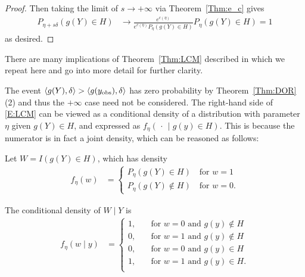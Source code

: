 \begin{proof}
Then taking the limit of $s \to +\infty$ via Theorem~\ref{Thm:e_c} gives
\begin{align*}
 P_{\eta+s\delta}(g(Y) \in H)
		&\to \frac{e^{c(\eta)}}{ e^{c(\eta)} P_\eta (g(Y) \in H) } P_\eta (g(Y)\in H) = 1
 \end{align*}
 as desired.   
\end{proof}


There are many implications of Theorem~\ref{Thm:LCM} described in \citet{Geyer:gdor}
which we repeat here and go into more detail for further clarity.

The event $\langle g(Y),\delta \rangle > \langle g(y_{\text{obs}}),\delta \rangle$ has zero probability by 
Theorem~\ref{Thm:DOR}(2) and thus the $+\infty$ case need not be considered.
The right-hand side of \eqref{E:LCM} can be viewed as a conditional density of a 
distribution with parameter $\eta$ given $g(Y) \in H$, and expressed as $f_{\eta}
(\, \cdot\,  \mid g(y) \in H)$.  This is because the numerator
is in fact a joint density, which can be reasoned as follows:

Let $W = I(g(Y) \in H)$, which has density 
\begin{align*}
	f_\eta(w) &= \begin{cases}
					P_\eta(g(Y) \in H) \quad \text{for $w=1$} \\
					P_\eta(g(Y) \notin H) \quad \text{for $w=0$}.
				\end{cases}
\end{align*}

The conditional density of $W \mid Y$ is
\begin{align*}
	f_\eta(w \mid y) &= \begin{cases}
			1, 	\quad &\text{for $w=0$ and $g(y) \notin H$}\\
			0, 	\quad &\text{for $w=1$ and $g(y) \notin H$}\\
			0, 	\quad &\text{for $w=0$ and $g(y) \in H$}\\
			1, 	\quad &\text{for $w=1$ and $g(y) \in H$}.\\
 		\end{cases}
\end{align*}

